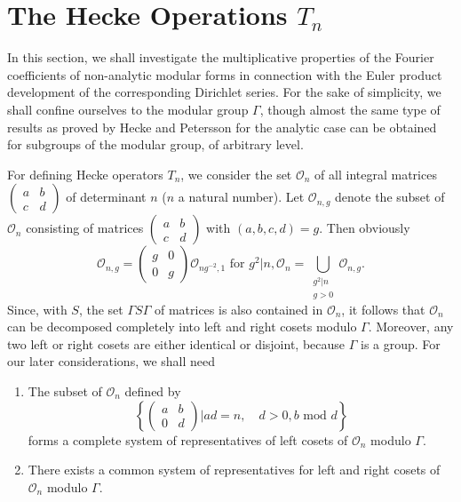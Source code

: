 \section{The Hecke Operations $T_n$}\label{chap5:sec3}\pageoriginale

In this section, we shall investigate the multiplicative properties of
the Fourier coefficients of non-analytic modular forms in connection
with the Euler product development of the corresponding Dirichlet
series. For the sake of simplicity, we shall confine ourselves to the
modular group $\Gamma$, though almost the same type of results as
proved by Hecke and Petersson for the analytic case can be obtained
for subgroups of the modular group, of arbitrary level. 

For defining Hecke operators $T_n$, we consider the set
$\mathcal{O}_n$ of all integral matrices
$\left(\begin{smallmatrix} a&b\\c&d \end{smallmatrix}\right)$ of
determinant $n$ ($n$ a natural number). Let $\mathcal{O}_{n,g}$ denote
the subset of $\mathcal{O}_n$ consisting of matrices
$\left(\begin{smallmatrix} a&b\\c&d\end{smallmatrix}\right)$ with
  $(a,b,c,d)=g$. Then obviously
\begin{equation*}
\mathcal{O}_{n,g} =
\left(\begin{smallmatrix} g&0\\0&g \end{smallmatrix}\right)
\mathcal{O}_{ng^{-2},1} \text{ for } g^2|n, \mathcal{O}_n =
\bigcup_{\substack{g^2|n\\g>0}} \mathcal{O}_{n,g}. \tag{1}\label{c5:eq3:1}
\end{equation*}
Since, with $S$, the set $\Gamma S\Gamma$ of matrices is also
contained in $\mathcal{O}_n$, it follows that $\mathcal{O}_n$ can be
decomposed completely into left and right cosets modulo
$\Gamma$. Moreover, any two left or right cosets are either identical
or disjoint, because $\Gamma$ is a group. For our later
considerations, we shall need 

\begin{lem}\label{chap5:lem12}
\begin{enumerate}
\renewcommand{\labelenumi}{\theenumi)}
\item The subset of $\mathcal{O}_n$ defined by
$$
\left\{ \begin{pmatrix} a&b\\0&d 
\end{pmatrix}| ad =n,
\quad d >0, b\text{ mod } d\right\}
$$
forms a complete system of representatives of left cosets of
$\mathcal{O}_n$ modulo $\Gamma$.

\item There exists a common system of representatives for left and
right \pageoriginale cosets of $\mathcal{O}_n$ modulo $\Gamma$.
\end{enumerate}
\end{lem}

